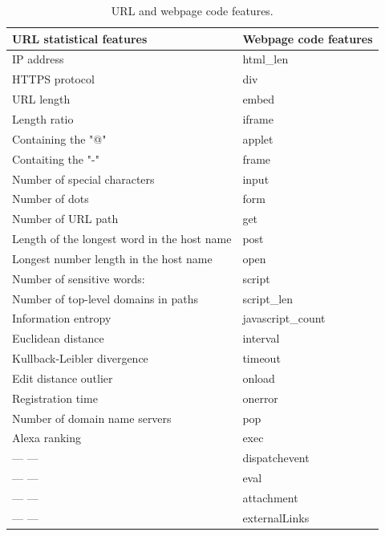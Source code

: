 \documentclass{ieeeaccess}
\begin{document}
\begin{table}[htp]
\caption{URL and webpage code features.}
\label{table:2}
\begin{tabular}{ll}
\hline
URL statistical features                    & Webpage code features \\ \hline
IP address                                  & html\_len              \\
HTTPS protocol                              & div                   \\
URL length                                  & embed                 \\
Length ratio                                & iframe                \\
Containing the "@"                          & applet                \\
Contaiting the "-"                          & frame                 \\
Number of special characters                & input                 \\
Number of dots                              & form                  \\
Number of URL path                          & get                   \\
Length of the longest word in the host name & post                  \\
Longest number length in the host name      & open                  \\
Number of sensitive words:                  & script                \\
Number of top-level domains in paths        & script\_len            \\
Information entropy                         & javascript\_count      \\
Euclidean distance                          & interval              \\
Kullback-Leibler divergence                 & timeout               \\
Edit distance outlier                       & onload                \\
Registration time                           & onerror               \\
Number of domain name servers               & pop                   \\
Alexa ranking                               & exec                  \\
--- ---                                     & dispatchevent         \\
--- ---                                     & eval                  \\
--- ---                                     & attachment            \\
--- ---                                     & externalLinks         \\ \hline
\end{tabular}
\end{table}
\end{document}
